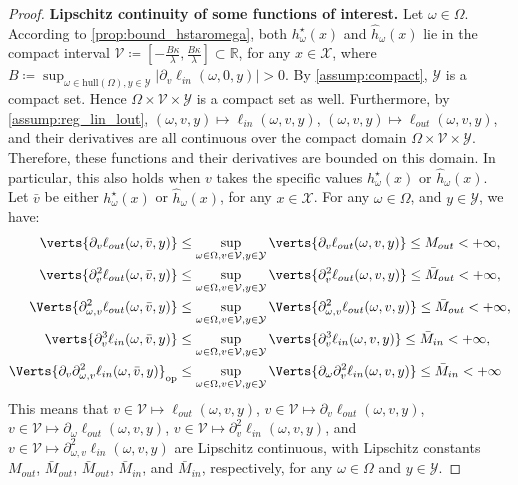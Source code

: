 \begin{proof}
\textbf{Lipschitz continuity of some functions of interest. }Let $\omega\in\Omega$. According to \cref{prop:bound_hstaromega}, both $h^\star_\omega(x)$ and $\hat{h}_\omega(x)$ lie in the compact interval $\mathcal{V}\coloneqq\left[-\frac{B\kappa}{\lambda},\frac{B\kappa}{\lambda}\right]\subset\mathbb{R}$, for any $x\in\mathcal{X}$, where $B\coloneqq\sup_{\omega\in\text{hull}(\Omega),y\in\mathcal{Y}}\left|\partial_v \ell_{in}(\omega, 0, y)\right|>0$. By \cref{assump:compact}, $\mathcal{Y}$ is a compact set. Hence $\Omega\times\mathcal{V}\times\mathcal{Y}$ is a compact set as well. Furthermore, by \cref{assump:reg_lin_lout}, $(\omega, v, y)\mapsto\ell_{in}(\omega, v, y)$, $(\omega, v, y)\mapsto\ell_{out}(\omega, v, y)$, and their derivatives are all continuous over the compact domain $\Omega\times\mathcal{V}\times\mathcal{Y}$. Therefore, these functions and their derivatives are bounded on this domain. In particular, this also holds when $v$ takes the specific values $h^\star_\omega(x)$ or $\hat{h}_\omega(x)$. Let $\bar{v}$ be either $h^\star_\omega(x)$ or $\hat{h}_\omega(x)$, for any $x\in\mathcal{X}$. For any $\omega\in\Omega$, and $y\in\mathcal{Y}$, we have:
\begin{align*}
    \verts{\partial_v\ell_{out}(\omega, \bar{v}, y)}&\leq\sup_{\omega\in\Omega,v\in\mathcal{V},y\in\mathcal{Y}}\verts{\partial_v\ell_{out}(\omega, v, y)}\leq M_{out}<+\infty,\\
   \verts{\partial_v^2\ell_{out}(\omega, \bar{v}, y)}&\leq\sup_{\omega\in\Omega,v\in\mathcal{V},y\in\mathcal{Y}}\verts{\partial_v^2\ell_{out}(\omega, v, y)}\leq\bar{M}_{out}<+\infty,\\
   \Verts{\partial_{\omega, v}^2\ell_{out}(\omega, \bar{v}, y)}&\leq\sup_{\omega\in\Omega,v\in\mathcal{V},y\in\mathcal{Y}}\Verts{\partial_{\omega, v}^2\ell_{out}(\omega, v, y)}\leq\bar{M}_{out}<+\infty,\\
   \verts{\partial_v^3\ell_{in}(\omega, \bar{v}, y)}&\leq\sup_{\omega\in\Omega,v\in\mathcal{V},y\in\mathcal{Y}}\verts{\partial_v^3\ell_{in}(\omega, v, y)}\leq\bar{M}_{in}<+\infty,\\
   \Verts{\partial_v\partial_{\omega, v}^2\ell_{in}(\omega, \bar{v}, y)}_{\op}&\leq\sup_{\omega\in\Omega,v\in\mathcal{V},y\in\mathcal{Y}}\Verts{\partial_\omega\partial_v^2\ell_{in}(\omega, v, y)}\leq\bar{M}_{in}<+\infty
\end{align*}
This means that $v\in\mathcal{V}\mapsto\ell_{out}(\omega, v, y)$, $v\in\mathcal{V}\mapsto\partial_v\ell_{out}(\omega, v, y)$, $v\in\mathcal{V}\mapsto\partial_\omega\ell_{out}(\omega, v, y)$, $v\in\mathcal{V}\mapsto\partial_v^2\ell_{in}(\omega, v, y)$, and $v\in\mathcal{V}\mapsto\partial_{\omega, v}^2\ell_{in}(\omega, v, y)$ are Lipschitz continuous, with Lipschitz constants $M_{out}$, $\bar{M}_{out}$, $\bar{M}_{out}$, $\bar{M}_{in}$, and $\bar{M}_{in}$, respectively, for any $\omega\in\Omega$ and $y\in\mathcal{Y}$.


\end{proof}
